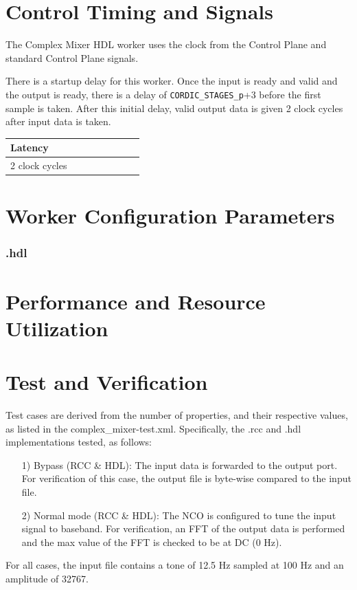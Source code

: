 \section*{Control Timing and Signals}
\begin{flushleft}
	The Complex Mixer HDL worker uses the clock from the Control Plane and standard Control Plane signals.\medskip

	There is a startup delay for this worker. Once the input is ready and valid and the output is ready, there is a delay of \verb+CORDIC_STAGES_p++3 before the first sample is taken. After this initial delay, valid output data is given 2 clock cycles after input data is taken.

	\begin{tabular}{|M{4.5cm}|M{1cm}|M{1cm}|M{1.5cm}|M{2cm}|M{1cm}|M{1cm}|M{2.5cm}|}
		\hline
		Latency         \\
		 clock cycles  \\
		\hline
	\end{tabular}
\end{flushleft}

\begin{landscape}
\section*{Worker Configuration Parameters}
\subsubsection*{\comp.hdl}

\section*{Performance and Resource Utilization}

\end{landscape}
\section*{Test and Verification}
Test cases are derived from the number of properties, and their respective values, as listed in the complex\_mixer-test.xml. Specifically, the \comp.rcc and \comp.hdl implementations tested, as follows:
\begin{itemize}
	\item[1)] Bypass (RCC \& HDL): The input data is forwarded to the output port. For verification of this case, the output file is byte-wise compared to the input file.
	\item[2)] Normal mode (RCC \& HDL): The NCO is configured to tune the input signal to baseband. For verification, an FFT of the output data is performed and the max value of the FFT is checked to be at DC (0 Hz).
\end{itemize}
\noindent For all cases, the input file contains a tone of 12.5 Hz sampled at 100 Hz and an amplitude of 32767.\par\medskip


